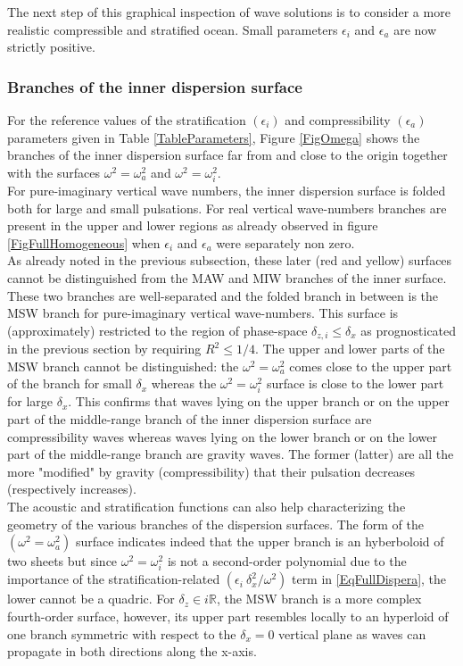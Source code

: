 \documentclass[a4paper,11pt]{article}
\begin{document}
The next step of this graphical inspection of wave solutions is to consider a more realistic compressible and stratified ocean. Small parameters $\epsilon_i$ and $\epsilon_a$ are now strictly positive.\\

\subsubsection{Branches of the inner dispersion surface}
For the reference values of the stratification $(\epsilon_i)$ and compressibility $(\epsilon_a)$ parameters given in Table \ref{TableParameters}, Figure \ref{FigOmega} shows the branches of the inner dispersion surface far from and close to the origin together with the surfaces $\omega^2=\omega_a^2$ and $\omega^2=\omega_i^2$.\\ 
For pure-imaginary vertical wave numbers, the inner dispersion surface is folded both for large and small pulsations. For real vertical wave-numbers branches are present in the upper and lower regions as already observed in figure \ref{FigFullHomogeneous} when $\epsilon_i$ and $\epsilon_a$ were separately non zero.\\
As already noted in the previous subsection, these later (red and yellow) surfaces cannot be distinguished from the MAW and MIW branches of the inner surface. These two branches are well-separated and the folded branch in between is the MSW branch for pure-imaginary vertical wave-numbers.  This surface is (approximately) restricted to the region of phase-space $\delta_{z,i}\leq\delta_x$ as prognosticated in the previous section by requiring $R^2\leq1/4$. The upper and lower parts of the MSW branch cannot be distinguished: the $\omega^2=\omega_a^2$ comes close to the upper part of the branch for small $\delta_x$ whereas the $\omega^2=\omega_i^2$ surface is close to the lower part for large $\delta_x$. This confirms that waves lying on the upper branch or on the upper part of the middle-range branch of the inner dispersion surface are compressibility waves whereas waves lying on the lower branch or on the lower part of the middle-range branch are gravity waves. The former (latter) are all the more "modified" by gravity (compressibility) that their pulsation decreases (respectively increases).\\
The acoustic and stratification functions can also help characterizing the geometry of the various branches of the dispersion surfaces. The form of the $(\omega^2=\omega_a^2)$ surface indicates indeed that the upper branch is an hyberboloid of two sheets but since $\omega^2=\omega_i^2$ is not a second-order polynomial due to the importance of the stratification-related $(\epsilon_i\ \delta_x^2 / \omega^2)$ term in \ref{EqFullDispera}, the lower cannot be a quadric. For $\delta_z\in i\mathbb{R}$, the MSW branch is a more complex fourth-order surface, however, its upper part resembles locally to an hyperloid of one branch symmetric with respect to the $\delta_x = 0$ vertical plane as waves can propagate in both directions along the x-axis.\\
\end{document}
